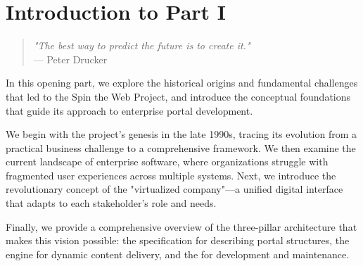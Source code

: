 
\chapter*{Introduction to Part I}
\label{part:foundations}

\begin{quote}
\textit{"The best way to predict the future is to create it."} \\
— Peter Drucker
\end{quote}

In this opening part, we explore the historical origins and fundamental challenges that led to the Spin the Web Project, and introduce the conceptual foundations that guide its approach to enterprise portal development.

We begin with the project's genesis in the late 1990s, tracing its evolution from a practical business challenge to a comprehensive framework. We then examine the current landscape of enterprise software, where organizations struggle with fragmented user experiences across multiple systems. Next, we introduce the revolutionary concept of the "virtualized company"—a unified digital interface that adapts to each stakeholder's role and needs.

Finally, we provide a comprehensive overview of the three-pillar architecture that makes this vision possible: the \wbdl{} specification for describing portal structures, the \webspinner{} engine for dynamic content delivery, and the \studio{} for development and maintenance.


